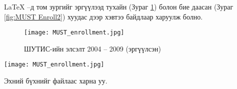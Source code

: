 \LaTeX{} --д том зургийг эргүүлээд тухайн (Зураг \ref{fig:MUST Enroll1}) болон бие даасан (Зураг \ref{fig:MUST Enroll2}) хуудас дээр хэвтээ байдлаар харуулж болно. 

\begin{figure}[!htbp]
	\centering
	\vspace{2mm}
	\texttt{[image: MUST\_enrollment.jpg]}
	\caption{ШУТИС-ийн элсэлт 2004 -- 2009 (эргүүлсэн)}
	\label{fig:MUST Enroll1}
\end{figure}

\begin{sidewaysfigure}[!htbp]
	\centering
	\vspace{2mm}
	\texttt{[image: MUST\_enrollment.jpg]}
	\caption{ШУТИС-ийн элсэлт 2004 -- 2009 (бүтэн хуудас)}
	\label{fig:MUST Enroll2}
\end{sidewaysfigure}

Эхний бүхнийг  файлаас харна уу. 
